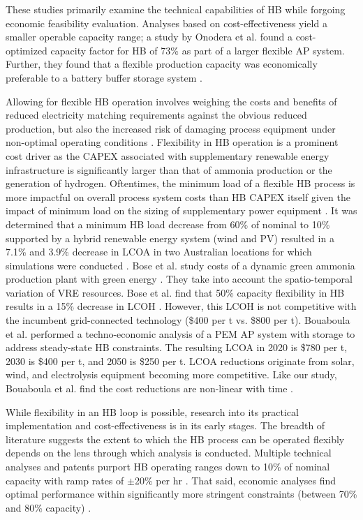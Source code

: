 \documentclass{article}
\begin{document}
These studies primarily examine the technical capabilities of HB while forgoing economic feasibility evaluation. Analyses based on cost-effectiveness yield a smaller operable capacity range; a study by Onodera et al. found a cost-optimized capacity factor for HB of 73\% as part of a larger flexible AP system. Further, they found that a flexible production capacity was economically preferable to a battery buffer storage system \cite{Onodera2023}.

Allowing for flexible HB operation involves weighing the costs and benefits of reduced electricity matching requirements against the obvious reduced production, but also the increased risk of damaging process equipment under non-optimal operating conditions \cite{Ostundi2011}. Flexibility in HB operation is a prominent cost driver as the CAPEX associated with supplementary renewable energy infrastructure is significantly larger than that of ammonia production or the generation of hydrogen. Oftentimes, the minimum load of a flexible HB process is more impactful on overall process system costs than HB CAPEX itself given the impact of minimum load on the sizing of supplementary power equipment \cite{Wang2023}. It was determined that a minimum HB load decrease from 60\% of nominal to 10\% supported by a hybrid renewable energy system (wind and PV) resulted in a 7.1\% and 3.9\% decrease in LCOA in two Australian locations for which simulations were conducted \cite{Wang2023}. Bose et al. study costs of a dynamic green ammonia production plant with green energy \cite{Bose2022}. They take into account the spatio-temporal variation of VRE resources. Bose et al. find that 50\% capacity flexibility in HB results in a 15\% decrease in LCOH \cite{Bose2022}. However, this LCOH is not competitive with the incumbent grid-connected technology (\$400 per t vs. \$800 per t). Bouaboula et al. performed a techno-economic analysis of a PEM AP system with storage to address steady-state HB constraints. The resulting LCOA in 2020 is \$780 per t, 2030 is \$400 per t, and 2050 is \$250 per t. LCOA reductions originate from solar, wind, and electrolysis equipment becoming more competitive. Like our study, Bouaboula et al. find the cost reductions are non-linear with time \cite{Bouaboula2023}.

While flexibility in an HB loop is possible, research into its practical implementation and cost-effectiveness is in its early stages. The breadth of literature suggests the extent to which the HB process can be operated flexibly depends on the lens through which analysis is conducted. Multiple technical analyses and patents purport HB operating ranges down to 10\% of nominal capacity with ramp rates of $\pm$20\% per hr \cite{Ostundi2011}. That said, economic analyses find optimal performance within significantly more stringent constraints (between 70\% and 80\% capacity) \cite{Verleysen2023, Onodera2023}.
\end{document}
